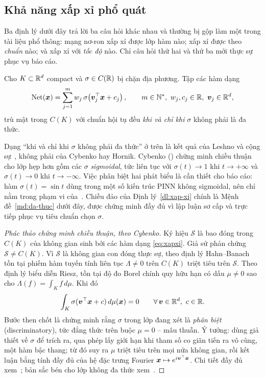 \subsection{Khả năng xấp xỉ phổ quát}
\label{subsec:xap-xi}
 
Ba định lý dưới đây trả lời ba câu hỏi khác nhau và thường bị gộp làm một trong
tài liệu phổ thông: mạng nơ-ron xấp xỉ được lớp hàm nào; xấp xỉ được theo
\emph{chuẩn} nào; và xấp xỉ với \emph{tốc độ} nào. Chỉ câu hỏi thứ hai và thứ ba
mới thực sự phục vụ báo cáo.
 
\begin{dinhly}
\label{dl:xap-xi}
Cho $K \subset \mathbb{R}^{d}$ compact và $\sigma \in C(\mathbb{R})$ bị chặn địa phương. Tập các
hàm dạng
\begin{equation}
\operatorname{Net}(\bm{x}) = \sum_{j=1}^{m} w_j\, \sigma\!\left( \bm{v}_j^{\top}\bm{x} + c_j
\right),
\qquad m \in \mathbb{N}^{*},\ w_j, c_j \in \mathbb{R},\ \bm{v}_j \in \mathbb{R}^{d},
\label{eq:xapxi}
\end{equation}
trù mật trong $C(K)$ với chuẩn hội tụ đều \emph{khi và chỉ khi} $\sigma$ không
phải là đa thức.
\end{dinhly}
 
\begin{nhanxet}
\label{nx:quy-ket}
Dạng ``khi và chỉ khi $\sigma$ không phải đa thức'' ở trên là kết quả của Leshno
và cộng sự~\cite{leshno1993}, không phải của Cybenko hay Hornik. Cybenko
(\cite{cybenko1989}) chứng minh chiều thuận cho lớp hẹp hơn gồm các $\sigma$
\emph{sigmoidal}, tức liên tục với $\sigma(t)\to 1$ khi $t\to+\infty$ và
$\sigma(t)\to 0$ khi $t\to-\infty$. Việc phân biệt hai phát biểu là cần thiết
cho báo cáo: hàm $\sigma(t) = \sin t$ dùng trong một số kiến trúc PINN không
sigmoidal, nên chỉ nằm trong phạm vi của~\cite{leshno1993}. Chiều đảo của
Định lý~\ref{dl:xap-xi} chính là Mệnh đề~\ref{md:da-thuc} dưới đây, được chứng
minh đầy đủ vì lập luận sơ cấp và trực tiếp phục vụ tiêu chuẩn chọn $\sigma$.
\end{nhanxet}
 
\begin{proof}[Phác thảo chứng minh chiều thuận, theo Cybenko]
Ký hiệu $\mathcal{S}$ là bao đóng trong $C(K)$ của không gian sinh bởi các hàm
dạng \eqref{eq:xapxi}. Giả sử phản chứng $\mathcal{S} \ne C(K)$. Vì
$\mathcal{S}$ là không gian con đóng thực sự, theo định lý Hahn--Banach tồn tại
phiếm hàm tuyến tính liên tục $\Lambda \ne 0$ trên $C(K)$ triệt tiêu trên
$\mathcal{S}$. Theo định lý biểu diễn Riesz, tồn tại độ đo Borel chính quy hữu
hạn có dấu $\mu \ne 0$ sao cho $\Lambda(f) = \int_K f\,d\mu$. Khi đó
\[
\int_K \sigma(\bm{v}^{\top}\bm{x} + c)\, d\mu(\bm{x}) = 0
\qquad \forall\, \bm{v} \in \mathbb{R}^d,\ c \in \mathbb{R} .
\]
Bước then chốt là chứng minh rằng $\sigma$ trong lớp đang xét là \emph{phân
biệt} (discriminatory), tức đẳng thức trên buộc $\mu = 0$ -- mâu thuẫn. Ý tưởng:
dùng giả thiết về $\sigma$ để trích ra, qua phép lấy giới hạn khi tham số co
giãn tiến ra vô cùng, một hàm bậc thang; từ đó suy ra $\mu$ triệt tiêu trên mọi
nửa không gian, rồi kết luận bằng tính đầy đủ của hệ đặc trưng Fourier
$\bm{x}\mapsto e^{i\bm{v}^{\top}\bm{x}}$. Chi tiết đầy đủ xem~\cite{cybenko1989}; bản
sắc bén cho lớp không đa thức xem~\cite{leshno1993}.
\end{proof}
 
